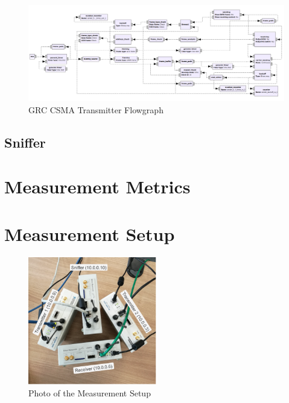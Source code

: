 \begin{figure}
	\label{fig:grc-csma-sender}
	\begin{center}
		\includegraphics[width=\textwidth]{pictures/grc_csma_transmitter_flowgraph}
\end{center}
\caption{GRC CSMA Transmitter Flowgraph}
\end{figure}

\subsection{Sniffer}

\clearpage

\section{Measurement Metrics}

\section{Measurement Setup}

\begin{figure}[ht]
	\label{fig:measurement-setup}
	\begin{center}
		\includegraphics[width=0.5\textwidth]{pictures/measurement_setup}
	\end{center}
	\caption{Photo of the Measurement Setup}
\end{figure}

